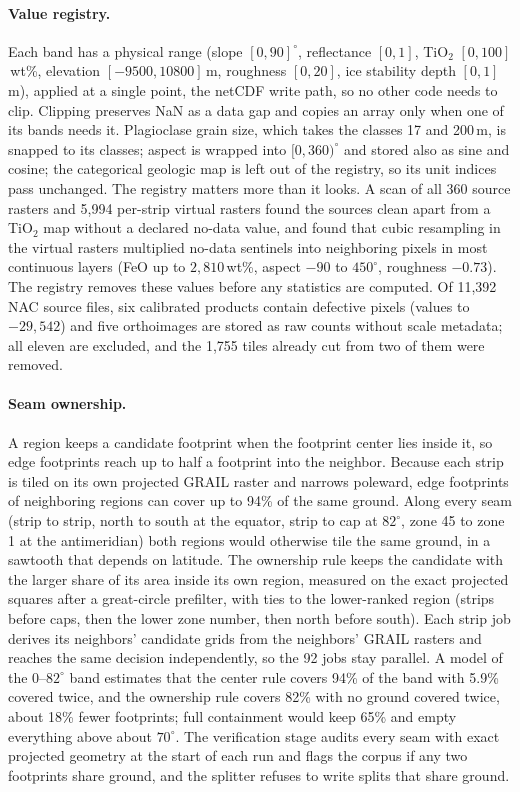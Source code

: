 \paragraph{Value registry.} Each band has a physical range (slope $[0, 90]^\circ$, reflectance $[0, 1]$, TiO$_2$ $[0, 100]$\,wt\%, elevation $[-9500, 10800]$\,m, roughness $[0, 20]$, ice stability depth $[0, 1]$\,m), applied at a single point, the netCDF write path, so no other code needs to clip. Clipping preserves NaN as a data gap and copies an array only when one of its bands needs it. Plagioclase grain size, which takes the classes 17 and 200\,\textmu m, is snapped to its classes; aspect is wrapped into $[0, 360)^\circ$ and stored also as sine and cosine; the categorical geologic map is left out of the registry, so its unit indices pass unchanged. The registry matters more than it looks. A scan of all 360 source rasters and 5,994 per-strip virtual rasters found the sources clean apart from a TiO$_2$ map without a declared no-data value, and found that cubic resampling in the virtual rasters multiplied no-data sentinels into neighboring pixels in most continuous layers (FeO up to $2{,}810$\,wt\%, aspect $-90$ to $450^\circ$, roughness $-0.73$). The registry removes these values before any statistics are computed. Of 11,392 NAC source files, six calibrated products contain defective pixels (values to $-29{,}542$) and five orthoimages are stored as raw counts without scale metadata; all eleven are excluded, and the 1,755 tiles already cut from two of them were removed.

\paragraph{Seam ownership.} A region keeps a candidate footprint when the footprint center lies inside it, so edge footprints reach up to half a footprint into the neighbor. Because each strip is tiled on its own projected GRAIL raster and narrows poleward, edge footprints of neighboring regions can cover up to 94\% of the same ground. Along every seam (strip to strip, north to south at the equator, strip to cap at $82^\circ$, zone 45 to zone 1 at the antimeridian) both regions would otherwise tile the same ground, in a sawtooth that depends on latitude. The ownership rule keeps the candidate with the larger share of its area inside its own region, measured on the exact projected squares after a great-circle prefilter, with ties to the lower-ranked region (strips before caps, then the lower zone number, then north before south). Each strip job derives its neighbors' candidate grids from the neighbors' GRAIL rasters and reaches the same decision independently, so the 92 jobs stay parallel. A model of the $0$--$82^\circ$ band estimates that the center rule covers 94\% of the band with 5.9\% covered twice, and the ownership rule covers 82\% with no ground covered twice, about 18\% fewer footprints; full containment would keep 65\% and empty everything above about $70^\circ$. The verification stage audits every seam with exact projected geometry at the start of each run and flags the corpus if any two footprints share ground, and the splitter refuses to write splits that share ground. 

